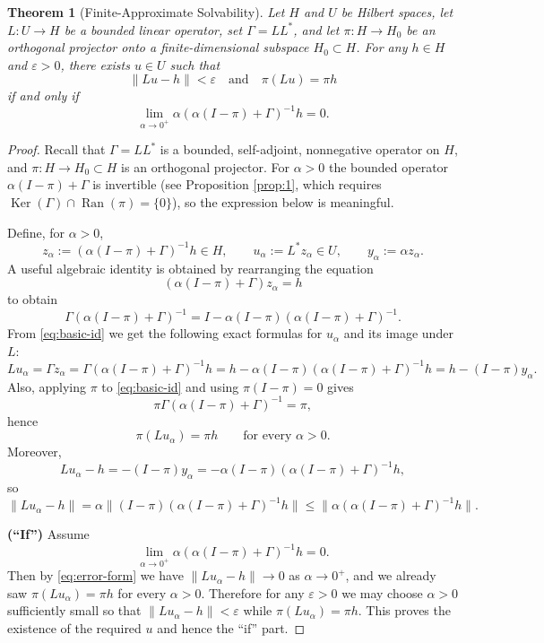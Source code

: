 \documentclass[10pt,a4paper]{amsart}
\newtheorem{theorem}{Theorem}
\DeclareMathOperator{\Ker}{Ker}
\DeclareMathOperator{\Ran}{Ran}
\begin{document}
	\begin{theorem}[Finite-Approximate Solvability]
		Let \(H\) and \(U\) be Hilbert spaces, let \(L: U \to H\) be a bounded linear operator, set \(\Gamma = LL^*\), and let \(\pi: H \to H_0\) be an orthogonal projector onto a finite-dimensional subspace \(H_0 \subset H\). For any \(h \in H\) and \(\varepsilon > 0\), there exists \(u \in U\) such that
		\[
		\|Lu - h\| < \varepsilon \quad \text{and} \quad \pi(Lu) = \pi h
		\]
		if and only if
		\[
		\lim_{\alpha \to 0^+} \alpha (\alpha(I-\pi) + \Gamma)^{-1} h = 0.
		\]
	\end{theorem}

	\begin{proof}
		Recall that \(\Gamma = LL^*\) is a bounded, self-adjoint, nonnegative operator on \(H\), and \(\pi: H \to H_0 \subset H\) is an orthogonal projector. For \(\alpha > 0\) the bounded operator \(\alpha(I-\pi) + \Gamma\) is invertible (see Proposition \ref{prop:1}, which requires \(\Ker(\Gamma) \cap \Ran(\pi) = \{0\}\)), so the expression below is meaningful.
		
		Define, for \(\alpha > 0\),
		\[
		z_\alpha := (\alpha(I-\pi)+\Gamma)^{-1} h \in H,
		\qquad
		u_\alpha := L^* z_\alpha \in U,
		\qquad
		y_\alpha := \alpha z_\alpha.
		\]
		A useful algebraic identity is obtained by rearranging the equation
		\[
		(\alpha(I-\pi)+\Gamma) z_\alpha = h
		\]
		to obtain
		\begin{equation}\label{eq:basic-id}
			\Gamma(\alpha(I-\pi)+\Gamma)^{-1} = I - \alpha (I-\pi)(\alpha(I-\pi)+\Gamma)^{-1}.
		\end{equation}
		From \eqref{eq:basic-id} we get the following exact formulas for \(u_\alpha\) and its image under \(L\):
		\[
		L u_\alpha = \Gamma z_\alpha = \Gamma(\alpha(I-\pi)+\Gamma)^{-1} h
		= h - \alpha (I-\pi)(\alpha(I-\pi)+\Gamma)^{-1} h
		= h - (I-\pi) y_\alpha.
		\]
		Also, applying \(\pi\) to \eqref{eq:basic-id} and using \(\pi(I-\pi)=0\) gives
		\[
		\pi\Gamma(\alpha(I-\pi)+\Gamma)^{-1} = \pi,
		\]
		hence
		\[
		\pi(Lu_\alpha)=\pi h \qquad\text{for every }\alpha>0.
		\]
		Moreover,
		\begin{equation}\label{eq:error-form}
			Lu_\alpha - h = - (I-\pi) y_\alpha
			= -\alpha (I-\pi)(\alpha(I-\pi)+\Gamma)^{-1} h,
		\end{equation}
		so
		\[
		\|Lu_\alpha-h\| = \alpha\big\|(I-\pi)(\alpha(I-\pi)+\Gamma)^{-1}h\big\|
		\le \big\| \alpha(\alpha(I-\pi)+\Gamma)^{-1} h\big\|.
		\]
		
		\medskip\noindent
		\textbf{(``If'')} Assume
		\[
		\lim_{\alpha\to0^+}\alpha(\alpha(I-\pi)+\Gamma)^{-1}h = 0.
		\]
		Then by \eqref{eq:error-form} we have \(\|Lu_\alpha-h\|\to0\) as \(\alpha\to0^+\), and we already saw \(\pi(Lu_\alpha)=\pi h\) for every \(\alpha>0\). Therefore for any \(\varepsilon>0\) we may choose \(\alpha>0\) sufficiently small so that \(\|Lu_\alpha-h\|<\varepsilon\) while \(\pi(Lu_\alpha)=\pi h\). This proves the existence of the required \(u\) and hence the ``if'' part.
		

\end{proof}
\end{document}
